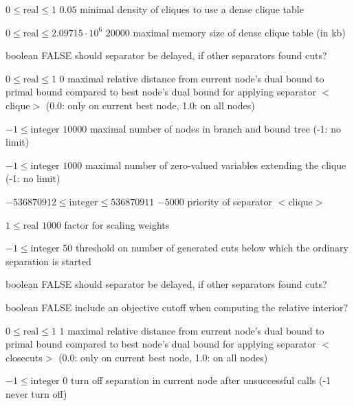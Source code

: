 %
{$0\leq\textrm{real}\leq1$}%
{$0.05$}%
{minimal density of cliques to use a dense clique table}%
{}

%
{$0\leq\textrm{real}\leq2.09715 \cdot 10^{  6}$}%
{$20000$}%
{maximal memory size of dense clique table (in kb)}%
{}

%
{boolean}%
{FALSE}%
{should separator be delayed, if other separators found cuts?}%
{}

%
{$0\leq\textrm{real}\leq1$}%
{$0$}%
{maximal relative distance from current node's dual bound to primal bound compared to best node's dual bound for applying separator $<$clique$>$ (0.0: only on current best node, 1.0: on all nodes)}%
{}

%
{$-1\leq\textrm{integer}$}%
{$10000$}%
{maximal number of nodes in branch and bound tree (-1: no limit)}%
{}

%
{$-1\leq\textrm{integer}$}%
{$1000$}%
{maximal number of zero-valued variables extending the clique (-1: no limit)}%
{}

%
{$-536870912\leq\textrm{integer}\leq536870911$}%
{$-5000$}%
{priority of separator $<$clique$>$}%
{}

%
{$1\leq\textrm{real}$}%
{$1000$}%
{factor for scaling weights}%
{}

%
{$-1\leq\textrm{integer}$}%
{$50$}%
{threshold on number of generated cuts below which the ordinary separation is started}%
{}

%
{boolean}%
{FALSE}%
{should separator be delayed, if other separators found cuts?}%
{}

%
{boolean}%
{FALSE}%
{include an objective cutoff when computing the relative interior?}%
{}

%
{$0\leq\textrm{real}\leq1$}%
{$1$}%
{maximal relative distance from current node's dual bound to primal bound compared to best node's dual bound for applying separator $<$closecuts$>$ (0.0: only on current best node, 1.0: on all nodes)}%
{}

%
{$-1\leq\textrm{integer}$}%
{$0$}%
{turn off separation in current node after unsuccessful calls (-1 never turn off)}%
{}

